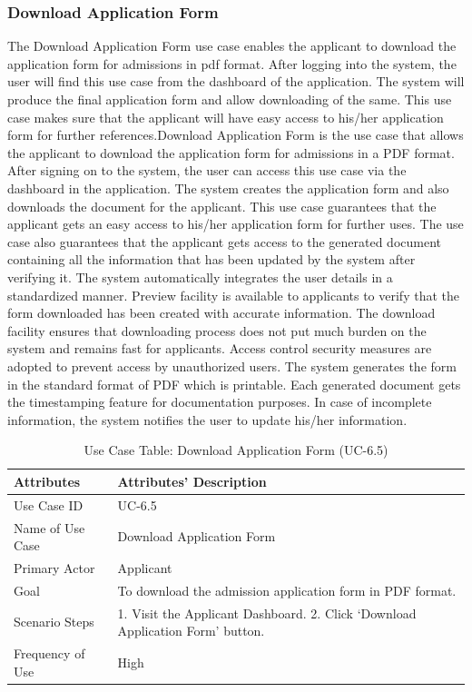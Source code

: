 \subsubsection{Download Application Form}
The Download Application Form use case enables the applicant to download the application form for admissions in pdf format. After logging into the system, the user will find this use case from the dashboard of the application. The system will produce the final application form and allow downloading of the same. This use case makes sure that the applicant will have easy access to his/her application form for further references.Download Application Form is the use case that allows the applicant to download the application form for admissions in a PDF format. After signing on to the system, the user can access this use case via the dashboard in the application. The system creates the application form and also downloads the document for the applicant. This use case guarantees that the applicant gets an easy access to his/her application form for further uses. The use case also guarantees that the applicant gets access to the generated document containing all the information that has been updated by the system after verifying it. The system automatically integrates the user details in a standardized manner. Preview facility is available to applicants to verify that the form downloaded has been created with accurate information. The download facility ensures that downloading process does not put much burden on the system and remains fast for applicants. Access control security measures are adopted to prevent access by unauthorized users. The system generates the form in the standard format of PDF which is printable. Each generated document gets the timestamping feature for documentation purposes. In case of incomplete information, the system notifies the user to update his/her information.

\begin{table}[H]
    \centering
    \small
    \renewcommand{\arraystretch}{1.4}
    \caption{Use Case Table: Download Application Form (UC-6.5)}
    \label{tab:download_application_form}
    
    \begin{tabularx}{\textwidth}{|l|X|}
        \hline
        \rowcolor[gray]{0.9} {Attributes} & {Attributes' Description} \\ \hline
        Use Case ID & UC-6.5 \\ \hline
        Name of Use Case & Download Application Form \\ \hline
        Primary Actor & Applicant \\ \hline
        Goal & To download the admission application form in PDF format. \\ \hline
        Scenario Steps & 1. Visit the Applicant Dashboard. 2. Click ‘Download Application Form’ button. \\ \hline
        Frequency of Use & High \\ \hline
    \end{tabularx}
\end{table}
\FloatBarrier